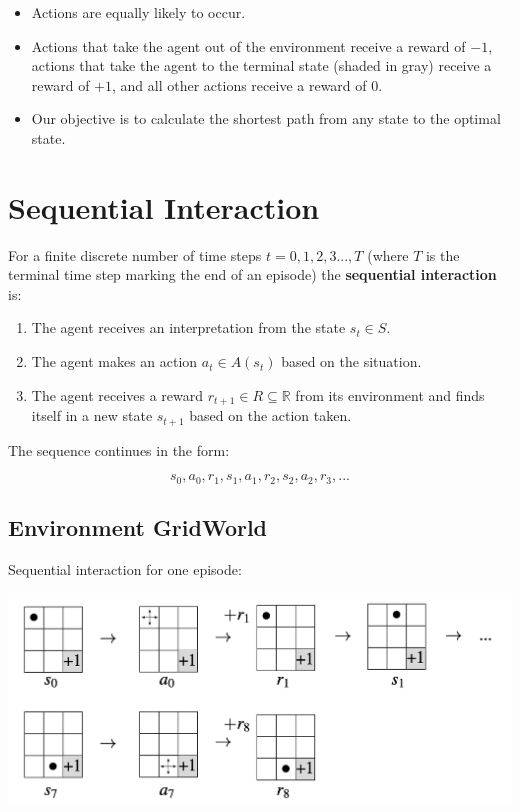 \documentclass[
  letterpaper,
  DIV=11,
  numbers=noendperiod]{scrreprt}
\providecommand{\tightlist}{%
  \setlength{\itemsep}{0pt}\setlength{\parskip}{0pt}}\usepackage{longtable,booktabs,array}
\begin{document}
\begin{itemize}
\tightlist
\item
  Actions are equally likely to occur.
\item
  Actions that take the agent out of the environment receive a reward of
  \(-1\), actions that take the agent to the terminal state (shaded in
  gray) receive a reward of \(+1\), and all other actions receive a
  reward of \(0\).
\item
  Our objective is to calculate the shortest path from any state to the
  optimal state.
\end{itemize}

\section{Sequential Interaction}\label{sequential-interaction}

For a finite discrete number of time steps \(t = 0, 1, 2, 3...,T\)
(where \(T\) is the terminal time step marking the end of an episode)
the \textbf{sequential interaction} is:

\begin{enumerate}
\def\labelenumi{\arabic{enumi}.}
\tightlist
\item
  The agent receives an interpretation from the state \(s_t \in S\).
\item
  The agent makes an action \(a_t \in A(s_t)\) based on the situation.
\item
  The agent receives a reward \(r_{t+1} \in R \subseteq \mathbb{R}\)
  from its environment and finds itself in a new state \(s_{t+1}\) based
  on the action taken.
\end{enumerate}

The sequence continues in the form:

\[
s_0, a_0, r_1, s_1, a_1, r_2, s_2, a_2, r_3,...
\]

\subsection{Environment GridWorld}\label{environment-gridworld-1}

Sequential interaction for one episode:

\begin{center}
\includegraphics[width=0.75\linewidth,height=\textheight,keepaspectratio]{lecture4/images/SequentialGridworld-ex.png}
\end{center}
\end{document}
